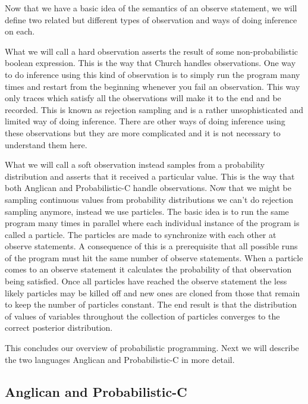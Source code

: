 \documentclass[a4paper]{article}
\begin{document}
Now that we have a basic idea of the semantics of an observe statement, we will define two related but different types of observation and ways of doing inference on each.

What we will call a hard observation asserts the result of some non-probabilistic boolean expression. This is the way that Church handles observations. One way to do inference using this kind of observation is to simply run the program many times and restart from the beginning whenever you fail an observation. This way only traces which satisfy all the observations will make it to the end and be recorded. This is known as rejection sampling and is a rather unsophisticated and limited way of doing inference. There are other ways of doing inference using these observations but they are more complicated and it is not necessary to understand them here.

What we will call a soft observation instead samples from a probability distribution and asserts that it received a particular value. This is the way that both Anglican and Probabilistic-C handle observations. Now that we might be sampling continuous values from probability distributions we can't do rejection sampling anymore, instead we use particles. The basic idea is to run the same program many times in parallel where each individual instance of the program is called a particle. The particles are made to synchronize with each other at observe statements. A consequence of this is a prerequisite that all possible runs of the program must hit the same number of observe statements. When a particle comes to an observe statement it calculates the probability of that observation being satisfied. Once all particles have reached the observe statement the less likely particles may be killed off and new ones are cloned from those that remain to keep the number of particles constant. The end result is that the distribution of values of variables throughout the collection of particles converges to the correct posterior distribution.

This concludes our overview of probabilistic programming. Next we will describe the two languages Anglican and Probabilistic-C in more detail.




\subsection{Anglican and Probabilistic-C}
\end{document}
